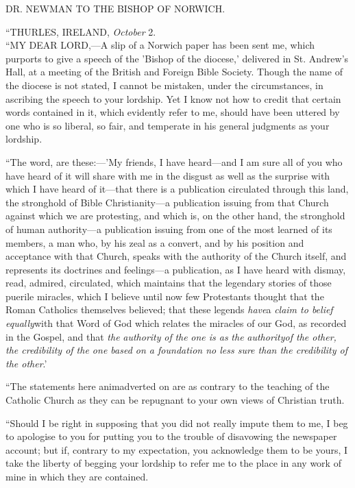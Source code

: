



DR. NEWMAN TO THE BISHOP OF NORWICH.

``THURLES, IRELAND, \emph{October} 2. \emph{}\\
``MY DEAR
LORD,—A slip of a Norwich paper has
been sent me, which purports to give a speech of the
'Bishop of the diocese,' delivered in St. Andrew's Hall,
at a meeting of the British and Foreign Bible Society.
Though the name of the diocese is not stated, I cannot be
mistaken, under the circumstances, in ascribing the
speech to your lordship. Yet I know not how to credit
that certain words contained in it, which evidently refer
to me, should have been uttered by one who is so liberal,
so fair, and temperate in his general judgments as your
lordship.


``The word, are these:—'My friends, I have
heard—and I am sure all of you who have heard of it
will share with me in the disgust as well as the surprise
with which I have heard of it—that there is a
publication circulated through this land, the stronghold
of Bible Christianity—a publication issuing from
that Church against which we are protesting, and which
is, on the other hand, the stronghold of human
authority—a publication issuing from one of the most
learned of its members, a man who, by his zeal as a
convert, and by his position and acceptance with that
Church, speaks with the authority of the Church itself,
and represents its doctrines and feelings—a
publication, as I have heard with dismay, read, admired,
circulated, which maintains that the legendary stories of
those puerile miracles, which I believe until now few
Protestants thought that the Roman Catholics themselves
believed; that these legends \emph{have}a \emph{claim to
belief equally}with that Word of God which relates
the miracles of our God, as recorded in the Gospel, and
that \emph{the} \emph{authority} \emph{of} \emph{the} \emph{one
is as} \emph{the} \emph{authority}\emph{of the other, the
credibility of the one based on a foundation no less sure
than the credibility of the other}.'


``The statements here animadverted on are as
contrary to the teaching of the Catholic Church as they
can be repugnant to your own views of Christian truth.


``Should I be right in supposing that you did not
really impute them to me, I beg to apologise to you for
putting you to the trouble of disavowing the newspaper
account; but if, contrary to my expectation, you
acknowledge them to be yours, I take the liberty of
begging your lordship to refer me to the place in any
work of mine in which they are contained.



